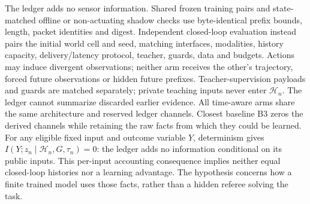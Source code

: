 \documentclass{article}
\newcommand{\Hist}{\mathcal{H}}
\begin{document}
The ledger adds no sensor information. Shared frozen training pairs and state-matched offline or non-actuating shadow checks use byte-identical prefix bounds, length, packet identities and digest. Independent closed-loop evaluation instead pairs the initial world cell and seed, matching interfaces, modalities, history capacity, delivery/latency protocol, teacher, guards, data and budgets. Actions may induce divergent observations; neither arm receives the other's trajectory, forced future observations or hidden future prefixes. Teacher-supervision payloads and guards are matched separately; private teaching inputs never enter $\Hist_n$. The ledger cannot summarize discarded earlier evidence. All time-aware arms share the same architecture and reserved ledger channels. Closest baseline B3 zeros the derived channels while retaining the raw facts from which they could be learned. For any eligible fixed input and outcome variable $Y$, determinism gives $I(Y;z_n\mid\Hist_n,G,\tau_n)=0$: the ledger adds no information conditional on its public inputs. This per-input accounting consequence implies neither equal closed-loop histories nor a learning advantage. The hypothesis concerns how a finite trained model uses those facts, rather than a hidden referee solving the task.
\end{document}
